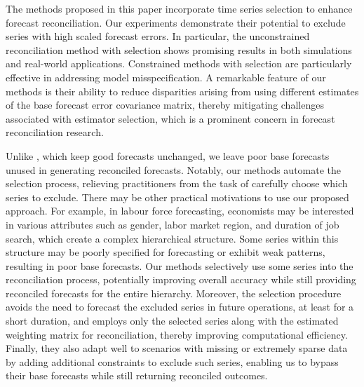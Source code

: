 \documentclass[
  11pt]{article}
\theoremstyle{plain}
\theoremstyle{remark}
\begin{document}
The methods proposed in this paper incorporate time series selection to
enhance forecast reconciliation. Our experiments demonstrate their
potential to exclude series with high scaled forecast
errors.
In particular, the unconstrained reconciliation method with selection
shows promising results in both simulations and real-world applications.
Constrained methods with selection are particularly effective in
addressing model misspecification. A remarkable feature of our methods
is their ability to reduce disparities arising from using different
estimates of the base forecast error covariance matrix, thereby
mitigating challenges associated with estimator selection, which is a
prominent concern in forecast reconciliation research.

Unlike \citet{Zhang2023-op}, which keep good forecasts unchanged, we
leave poor base forecasts unused in generating reconciled forecasts.
Notably, our methods automate the selection process, relieving
practitioners from the task of carefully choose which series to exclude.
There may be other practical motivations to use our proposed approach.
For example, in labour force forecasting, economists may be interested
in various attributes such as gender, labor market region, and duration
of job search, which create a complex hierarchical structure. Some
series within this structure may be poorly specified for forecasting or
exhibit weak patterns, resulting in poor base forecasts. Our methods
selectively use some series into the reconciliation process, potentially
improving overall accuracy while still providing reconciled forecasts
for the entire hierarchy. Moreover, the selection procedure avoids the
need to forecast the excluded series in future operations, at least for
a short duration, and employs only the selected series along with the
estimated weighting matrix for reconciliation, thereby improving
computational
efficiency.
Finally, they also adapt well to scenarios with missing or extremely
sparse data by adding additional constraints to exclude such series,
enabling us to bypass their base forecasts while still returning
reconciled outcomes.
\end{document}
